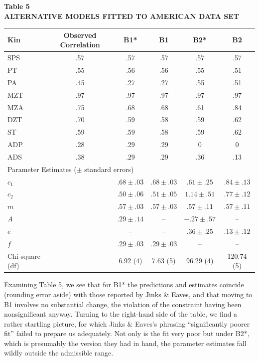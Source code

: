 ﻿\documentclass[12pt]{article}
\begin{document}
\begin{center}
\textbf{Table 5}\\
\textbf{ALTERNATIVE MODELS FITTED TO AMERICAN DATA SET}
\end{center}
\begin{center}
\small
\begin{tabular}{l c c c c c}
\hline
Kin & Observed Correlation & B1* & B1 & B2* & B2 \\
\hline
SPS & .57 & .57 & .57 & .57 & .57 \\
PT & .55 & .56 & .56 & .55 & .51 \\
PA & .45 & .27 & .27 & .55 & .51 \\
MZT & .97 & .97 & .97 & .97 & .97 \\
MZA & .75 & .68 & .68 & .61 & .84 \\
DZT & .70 & .59 & .58 & .59 & .62 \\
ST & .59 & .59 & .58 & .59 & .62 \\
ADP & .28 & .29 & .29 & 0 & 0 \\
ADS & .38 & .29 & .29 & .36 & .13 \\
\hline
\multicolumn{6}{l}{Parameter Estimates ($\pm$ standard errors)} \\
\hline
$c_1$ & & $.68\pm.03$ & $.68\pm.03$ & $.61\pm.25$ & $.84\pm.13$ \\
$c_2$ & & $.50\pm.06$ & $.51\pm.05$ & $1.14\pm.51$ & $.77\pm.12$ \\
$m$ & & $.57\pm.03$ & $.57\pm.03$ & $.57\pm.11$ & $.57\pm.11$ \\
$A$ & & $.29\pm.14$ & -- & $-.27\pm.57$ & -- \\
$e$ & & -- & -- & $.36\pm.25$ & $.13\pm.12$ \\
$f$ & & $.29\pm.03$ & $.29\pm.03$ & -- & -- \\
\hline
Chi-square (df) & & 6.92 (4) & 7.63 (5) & 96.29 (4) & 120.74 (5) \\
\hline
\end{tabular}
\end{center}

Examining Table 5, we see that for B1* the predictions and estimates coincide (rounding error aside) with those reported by Jinks \& Eaves, and that moving to B1 involves no substantial change, the violation of the constraint having been nonsignificant anyway. Turning to the right-hand side of the table, we find a rather startling picture, for which Jinks \& Eaves's phrasing ``significantly poorer fit'' failed to prepare us adequately. Not only is the fit very poor but under B2*, which is presumably the version they had in hand, the parameter estimates fall wildly outside the admissible range.
\end{document}
